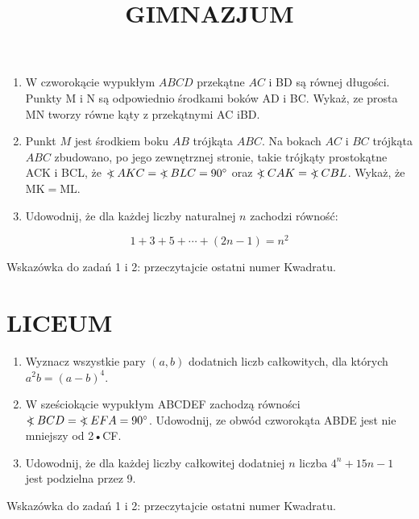 \documentclass[10pt]{article}
\title{GIMNAZJUM }
\author{}
\date{}
\newcommand\Varangle{\mathop{{<\!\!\!\!\!\text{\small)}}\:}\nolimits}
\begin{document}
\maketitle
\begin{enumerate}
  \item W czworokącie wypukłym \(A B C D\) przekątne \(A C\) i BD są równej długości. Punkty M i N są odpowiednio środkami boków AD i BC. Wykaż, ze prosta MN tworzy równe kąty z przekątnymi AC iBD.
  \item Punkt \(M\) jest środkiem boku \(A B\) trójkąta \(A B C\). Na bokach \(A C\) i \(B C\) trójkąta \(A B C\) zbudowano, po jego zewnętrznej stronie, takie trójkąty prostokątne ACK i BCL, że \(\Varangle A K C=\Varangle B L C=90^{\circ}\) oraz \(\Varangle C A K=\Varangle C B L\). Wykaż, że \(\mathrm{MK}=\mathrm{ML}\).
  \item Udowodnij, że dla każdej liczby naturalnej \(n\) zachodzi równość:
\end{enumerate}

\[
1+3+5+\cdots+(2 n-1)=n^{2}
\]

Wskazówka do zadań 1 i 2: przeczytajcie ostatni numer Kwadratu.

\section*{LICEUM}
\begin{enumerate}
  \item Wyznacz wszystkie pary \((a, b)\) dodatnich liczb całkowitych, dla których \(a^{2} b=(a-b)^{4}\).
  \item W sześciokącie wypukłym ABCDEF zachodzą równości \(\Varangle B C D=\Varangle E F A=90^{\circ}\). Udowodnij, ze obwód czworokąta ABDE jest nie mniejszy od 2•CF.
  \item Udowodnij, że dla każdej liczby całkowitej dodatniej \(n\) liczba \(4^{n}+15 n-1\) jest podzielna przez 9.
\end{enumerate}

Wskazówka do zadań 1 i 2: przeczytajcie ostatni numer Kwadratu.
\end{document}
